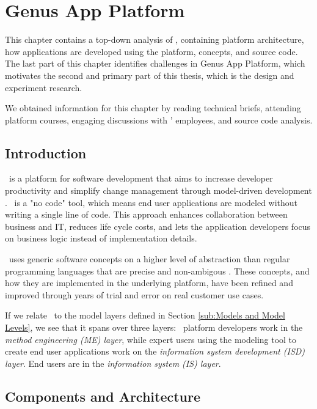 \chapter{Genus App Platform}
\label{chap:gap}

This chapter contains a top-down analysis of \gap, containing platform architecture, how applications are developed using the platform, concepts, and source code. The last part of this chapter identifies challenges in Genus App Platform, which motivates the second and primary part of this thesis, which is the design and experiment research.

We obtained information for this chapter by reading technical briefs, attending platform courses, engaging discussions with \genus' employees, and source code analysis.


\clearpage
\section{Introduction}
\label{sec:Introduction}


\gap~is a platform for software development that aims to increase developer productivity and simplify change management through model-driven development \cite{Genus_AS2016-kt}. \gap~is a "no code" tool, which means end user applications are modeled without writing a single line of code. This approach enhances collaboration between business and IT, reduces life cycle costs, and lets the application developers focus on business logic instead of implementation details. 

\gap~uses generic software concepts on a higher level of abstraction than regular programming languages that are precise and non-ambigous \cite{noauthor_undated-qy}. These concepts, and how they are implemented in the underlying platform, have been refined and improved through years of trial and error on real customer use cases.

If we relate \gap~to the model layers defined in Section \ref{sub:Models and Model Levels}, we see that it spans over three layers: \gap~platform developers work in the \textit{method engineering (ME) layer}, while expert users using the modeling tool to create end user applications work on the \textit{information system development (ISD) layer}. End users are in the \textit{information system (IS) layer}.

\section{Components and Architecture}
\label{sec:Components and Architecture}

